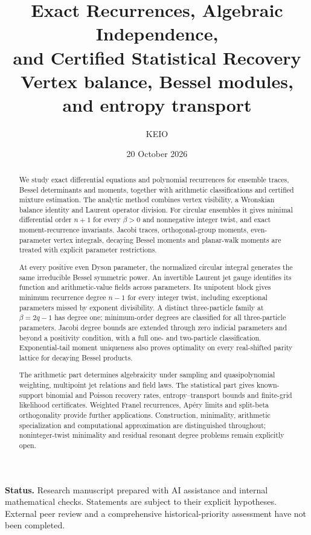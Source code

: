\documentclass[11pt,a4paper]{article}
\theoremstyle{definition}
\theoremstyle{remark}
\numberwithin{equation}{section}
\begin{document}
\title{Exact Recurrences, Algebraic Independence,\\
and Certified Statistical Recovery\\[6pt]
\large Vertex balance, Bessel modules, and entropy transport}
\author{KEIO}
\date{20 October 2026}
\maketitle
\begin{abstract}
We study exact differential equations and polynomial recurrences for
ensemble traces, Bessel determinants and moments, together with arithmetic
classifications and certified mixture estimation. The analytic method
combines vertex visibility, a Wronskian balance identity and Laurent
operator division. For circular ensembles it gives minimal differential
order $n+1$ for every $\beta>0$ and nonnegative integer twist, and exact
moment-recurrence invariants. Jacobi traces, orthogonal-group moments,
even-parameter vertex integrals, decaying Bessel moments and planar-walk
moments are treated with explicit parameter restrictions.

At every positive even Dyson parameter, the normalized circular integral
generates the same irreducible Bessel symmetric power. An invertible
Laurent jet gauge identifies its function and arithmetic-value fields
across parameters. Its unipotent block gives minimum recurrence degree
$n-1$ for every integer twist, including exceptional parameters missed
by exponent divisibility. A distinct three-particle family at
$\beta=2q-1$ has degree one; minimum-order degrees are classified for
all three-particle parameters. Jacobi degree bounds are extended through
zero indicial parameters and beyond a positivity condition, with a full
one- and two-particle classification. Exponential-tail moment uniqueness
also proves optimality on every real-shifted parity lattice for decaying
Bessel products.

The arithmetic part determines algebraicity under sampling and
quasipolynomial weighting, multipoint jet relations and field laws.
The statistical part gives known-support binomial and Poisson recovery
rates, entropy--transport bounds and finite-grid likelihood certificates.
Weighted Franel recurrences, Ap\'ery limits and split-beta orthogonality
provide further applications. Construction, minimality, arithmetic
specialization and computational approximation are distinguished
throughout; noninteger-twist minimality and residual resonant degree
problems remain explicitly open.
\end{abstract}
\noindent\textbf{Status.} Research manuscript prepared with AI assistance
and internal mathematical checks. Statements are subject to their
explicit hypotheses. External peer review and a comprehensive
historical-priority assessment have not been completed.
\clearpage
\begingroup\small\setlength{\parskip}{0pt}\tableofcontents\endgroup
\clearpage
\end{document}
